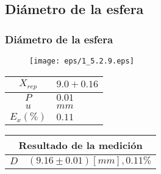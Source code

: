 \documentclass[letter,11pt]{beamer}
\begin{document}
\subsection{Diámetro de la esfera}
\begin{frame}
\frametitle{Diámetro de la esfera}
\vspace*{0.8cm}
\begin{figure}
\centering
\texttt{[image: eps/1\_5.2.9.eps]}
\end{figure}
\vspace*{0.4cm}
\scriptsize
\begin{tabular}{|c|>{\centering}m{1.8cm}<{\centering}|}
\hline
$X_{rep}$ &  $9.0+0.16$ \tabularnewline \hline
      $P$ &      $0.01$ \tabularnewline \hline
      $u$ &        $mm$ \tabularnewline \hline
$E_x(\%)$ &      $0.11$ \tabularnewline \hline
\end{tabular}
\quad
\begin{tabular}{|c|>{\centering}m{5.7cm}<{\centering}|}
\hline
\multicolumn{2}{|c|}{\textbf{Resultado de la medición}} \\ \hline
$D$ & $( 9.16\pm0.01)[mm], 0.11\%$ \tabularnewline \hline
\end{tabular}
\end{frame}
\end{document}
